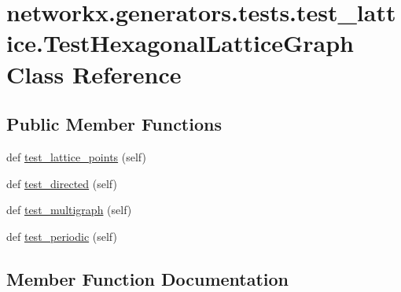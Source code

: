 \hypertarget{classnetworkx_1_1generators_1_1tests_1_1test__lattice_1_1TestHexagonalLatticeGraph}{}\section{networkx.\+generators.\+tests.\+test\+\_\+lattice.\+Test\+Hexagonal\+Lattice\+Graph Class Reference}
\label{classnetworkx_1_1generators_1_1tests_1_1test__lattice_1_1TestHexagonalLatticeGraph}
\subsection*{Public Member Functions}
\begin{DoxyCompactItemize}
\item 
def \hyperlink{classnetworkx_1_1generators_1_1tests_1_1test__lattice_1_1TestHexagonalLatticeGraph_aa616f1f3f7bb8f107d05e7e5b536baca}{test\+\_\+lattice\+\_\+points} (self)
\item 
def \hyperlink{classnetworkx_1_1generators_1_1tests_1_1test__lattice_1_1TestHexagonalLatticeGraph_adde11824022baf26c78e2db9fa02ee56}{test\+\_\+directed} (self)
\item 
def \hyperlink{classnetworkx_1_1generators_1_1tests_1_1test__lattice_1_1TestHexagonalLatticeGraph_a75704d57bdbf9ca99484643210474e88}{test\+\_\+multigraph} (self)
\item 
def \hyperlink{classnetworkx_1_1generators_1_1tests_1_1test__lattice_1_1TestHexagonalLatticeGraph_a2170ba8278c0732690c6feb80606a8af}{test\+\_\+periodic} (self)
\end{DoxyCompactItemize}


\subsection{Member Function Documentation}
\mbox{\label{classnetworkx_1_1generators_1_1tests_1_1test__lattice_1_1TestHexagonalLatticeGraph_adde11824022baf26c78e2db9fa02ee56}} 
